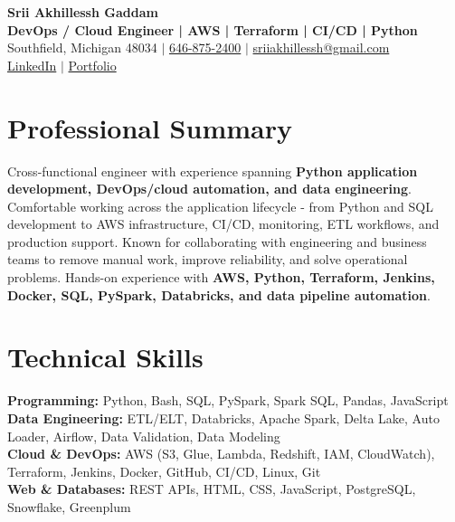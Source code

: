 \documentclass[letterpaper,10pt]{article}
\begin{document}
\fontsize{9.35pt}{10.45pt}\selectfont

\begin{center}
    {\LARGE \textbf{Srii Akhillessh Gaddam}} \\[-1pt]
    \textbf{DevOps / Cloud Engineer | AWS | Terraform | CI/CD | Python} \\[2pt]
    Southfield, Michigan 48034 $|$
    \href{tel:6468752400}{646-875-2400} $|$
    \href{mailto:sriiakhillessh@gmail.com}{sriiakhillessh@gmail.com} \\[1pt]
    \href{https://www.linkedin.com/in/srii-akhiilessh-gaddam-b48668191/}{LinkedIn} $|$
    \href{https://sriiakhillesshg.github.io/portfolio/}{Portfolio}
\end{center}
\vspace{-8pt}

\section{Professional Summary}
\small{Cross-functional engineer with experience spanning \textbf{Python application development, DevOps/cloud automation, and data engineering}. Comfortable working across the application lifecycle - from Python and SQL development to AWS infrastructure, CI/CD, monitoring, ETL workflows, and production support. Known for collaborating with engineering and business teams to remove manual work, improve reliability, and solve operational problems. Hands-on experience with \textbf{AWS, Python, Terraform, Jenkins, Docker, SQL, PySpark, Databricks, and data pipeline automation}.}

\section{Technical Skills}
\small{
\textbf{Programming:} Python, Bash, SQL, PySpark, Spark SQL, Pandas, JavaScript \\
\textbf{Data Engineering:} ETL/ELT, Databricks, Apache Spark, Delta Lake, Auto Loader, Airflow, Data Validation, Data Modeling \\
\textbf{Cloud \& DevOps:} AWS (S3, Glue, Lambda, Redshift, IAM, CloudWatch), Terraform, Jenkins, Docker, GitHub, CI/CD, Linux, Git \\
\textbf{Web \& Databases:} REST APIs, HTML, CSS, JavaScript, PostgreSQL, Snowflake, Greenplum
}
\end{document}
